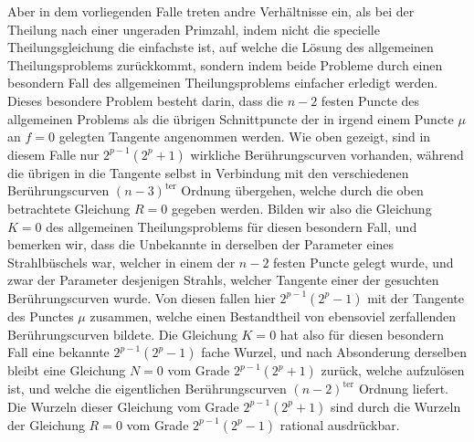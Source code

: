 \documentclass[10pt]{article}
\begin{document}
Aber in dem vorliegenden Falle treten andre Verhältnisse ein, als bei der Theilung nach einer ungeraden Primzahl, indem nicht die specielle Theilungsgleichung die einfachste ist, auf welche die Lösung des allgemeinen Theilungsproblems zurückkommt, sondern indem beide Probleme durch einen besondern Fall des allgemeinen Theilungsproblems einfacher erledigt werden. Dieses besondere Problem besteht darin, dass die \(n-2\) festen Puncte des allgemeinen Problems als die übrigen Schnittpuncte der in irgend einem Puncte \(\mu\) an \(f=0\) gelegten Tangente angenommen werden. Wie oben gezeigt, sind in diesem Falle nur \(2^{p-1}(2^p+1)\) wirkliche Berührungscurven vorhanden, während die übrigen in die Tangente selbst in Verbindung mit den verschiedenen Berührungscurven \((n-3)^{\text{ter}}\) Ordnung übergehen, welche durch die oben betrachtete Gleichung \(R=0\) gegeben werden. Bilden wir also die Gleichung \(K=0\) des allgemeinen Theilungsproblems für diesen besondern Fall, und bemerken wir, dass die Unbekannte in derselben der Parameter eines Strahlbüschels war, welcher in einem der \(n-2\) festen Puncte gelegt wurde, und zwar der Parameter desjenigen Strahls, welcher Tangente einer der gesuchten Berührungscurven wurde. Von diesen fallen hier \(2^{p-1}(2^p-1)\) mit der Tangente des Punctes \(\mu\) zusammen, welche einen Bestandtheil von ebensoviel zerfallenden Berührungscurven bildete. Die Gleichung \(K=0\) hat also für diesen besondern Fall eine bekannte \(2^{p-1}(2^p-1)\) fache Wurzel, und nach Absonderung derselben bleibt eine Gleichung \(N=0\) vom Grade \(2^{p-1}(2^p+1)\) zurück, welche aufzulösen ist, und welche die eigentlichen Berührungscurven \((n-2)^{\text{ter}}\) Ordnung liefert. Die Wurzeln dieser Gleichung vom Grade \(2^{p-1}(2^p+1)\) sind durch die Wurzeln der Gleichung \(R=0\) vom Grade \(2^{p-1}(2^p-1)\) rational ausdrückbar.
\end{document}
